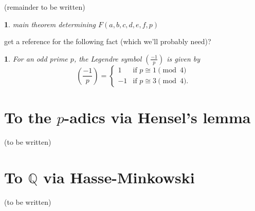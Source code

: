 \documentclass[10pt,a4paper]{amsart}
\numberwithin{equation}{section}
\numberwithin{figure}{section}
\theoremstyle{definition}
\theoremstyle{remark}
\theoremstyle{plain}
\newtheorem{thm}{\protect\theoremname}[section]
\theoremstyle{plain}
\theoremstyle{definition}
\theoremstyle{plain}
\newtheorem{prop}{\protect\propositionname}[section]
\theoremstyle{plain}
\providecommand{\propositionname}{Proposition}
\providecommand{\theoremname}{Theorem}
\newcommand{\legendre}[2]{\genfrac{(}{)}{}{}{#1}{#2}}
\begin{document}
(remainder to be written)

\begin{thm}
	main theorem determining $F(a,b,c,d,e,f,p)$
\end{thm}

get a reference for the following fact (which we'll probably need)?
\begin{prop}
	For an odd prime $p$, the Legendre symbol $\legendre{-1}{p}$ is given by
	\[
	\legendre{-1}{p} = \left\{
	\begin{matrix}
	1 & \text{if } p \cong 1 \pmod 4 \\
	-1 & \text{if } p \cong 3 \pmod 4.
	\end{matrix}
	\right.
	\]
\end{prop}

\section{To the $p$-adics via Hensel's lemma}
(to be written)

\section{To $\mathbb{Q}$ via Hasse-Minkowski}
(to be written)
\end{document}
